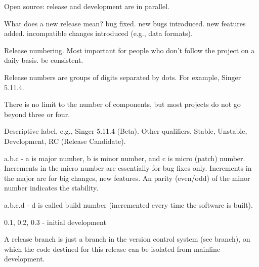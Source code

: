 \documentclass[landscape,30pt]{foils}
\begin{document}





Open source: release and development are in parallel.

What does a new release mean? bug fixed. new bugs introduced. new features added. incompatible changes introduced (e.g., data formats).

Release numbering.   Most important for people who don't follow the project on a daily basis.  be consistent. 



Release numbers are groups of digits separated by dots.  For example, Singer 5.11.4.

There is no limit to the number of components, but most projects do not go beyond three or four. 

Descriptive label, e.g., Singer 5.11.4 (Beta).  Other qualifiers, Stable, Unstable, Development, RC (Release Candidate).

a.b.c - a is major number,  b is minor number, and c is micro (patch) number.  Increments in the micro number  are essentially for bug fixes only. Increments in the major are for big changes, new features.   An parity (even/odd) of the minor number indicates the stability.


a.b.c.d - d is called build number (incremented every time the software is built).

0.1, 0.2, 0.3 -  initial development




A release branch is just a branch in the version control system (see branch), on which the code destined for this release can be isolated from mainline development. 

\end{document}

